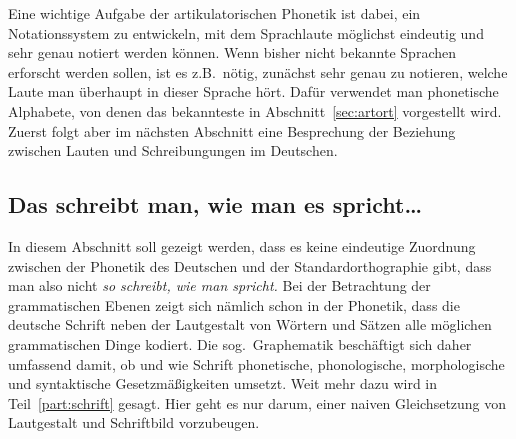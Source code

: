 Eine wichtige Aufgabe der artikulatorischen Phonetik ist dabei, ein Notationssystem zu entwickeln, mit dem Sprachlaute möglichst eindeutig und sehr genau notiert werden können.
Wenn bisher nicht bekannte Sprachen erforscht werden sollen, ist es z.B.\ nötig, zunächst sehr genau zu notieren, welche Laute man überhaupt in dieser Sprache hört.
Dafür verwendet man phonetische Alphabete, von denen das bekannteste in Abschnitt~\ref{sec:artort} vorgestellt wird.
Zuerst folgt aber im nächsten Abschnitt eine Besprechung der Beziehung zwischen Lauten und Schreibungungen im Deutschen.


\label{sec:schriftlaut}
\label{sec:unphonetischeschreibungen}

\subsection{Das schreibt man, wie man es spricht\ldots}


In diesem Abschnitt soll gezeigt werden, dass es keine eindeutige Zuordnung zwischen der Phonetik des Deutschen und der Standardorthographie gibt, dass man also nicht \textit{so schreibt, wie man spricht.}
Bei der Betrachtung der grammatischen Ebenen zeigt sich nämlich schon in der Phonetik, dass die deutsche Schrift neben der Lautgestalt von Wörtern und Sätzen alle möglichen grammatischen Dinge kodiert.
Die sog.\ Graphematik beschäftigt sich daher umfassend damit, ob und wie Schrift phonetische, phonologische, morphologische und syntaktische Gesetzmäßigkeiten umsetzt.
Weit mehr dazu wird in Teil~\ref{part:schrift} gesagt.
Hier geht es nur darum, einer naiven Gleichsetzung von Lautgestalt und Schriftbild vorzubeugen.

